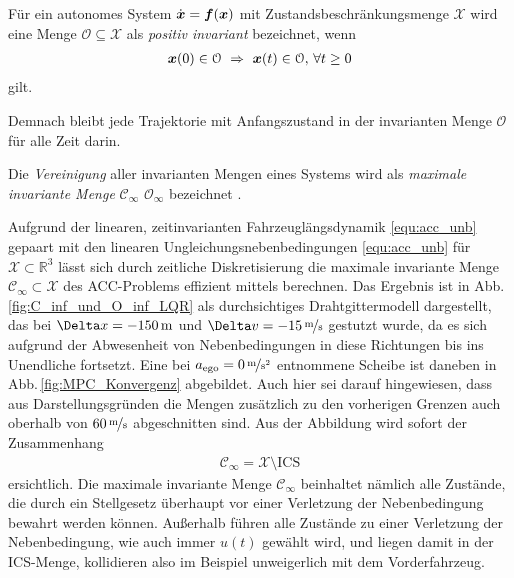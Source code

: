 \begin{mydef}
Für ein autonomes System $\dot {\boldsymbol{x}} = \boldsymbol{f}(\boldsymbol{x})$ mit Zustandsbeschränkungsmenge $\mathcal X$ wird eine Menge  $\mathcal O \subseteq \mathcal X$ als \emph{positiv invariant} bezeichnet, wenn
\begin{align*}
	\boldsymbol{x}(0) \in \mathcal O \,\,  \Rightarrow \,\,  \boldsymbol{x}(t) \in \mathcal O, \, \forall t \geq 0 
\end{align*}
gilt. 
\end{mydef}
Demnach bleibt jede Trajektorie mit Anfangszustand in der invarianten Menge $\mathcal O$ für alle Zeit darin.

\begin{mydef}
Die \emph{Vereinigung} aller invarianten Mengen eines Systems wird als \emph{maximale invariante Menge} $\mathcal C_{\infty}$ \bzw  $\mathcal O_{\infty}$ bezeichnet \cite{borrelli2014predictive}. %
\end{mydef}

Aufgrund der linearen, zeitinvarianten Fahrzeuglängsdynamik \eqref{equ:acc_unb} gepaart mit den linearen Ungleichungsnebenbedingungen \eqref{equ:acc_unb} für $\mathcal X \subset \mathbb R^3$ lässt sich durch zeitliche Diskretisierung die maximale invariante Menge $\mathcal C_{\infty} \subset \mathcal X$ des ACC-Problems effizient mittels \cite{herceg2013multi} berechnen. Das Ergebnis ist in Abb.\,\ref{fig:C_inf_und_O_inf_LQR} als durchsichtiges Drahtgittermodell dargestellt, das bei $\Delta x = -\unit[150]{m}$ und $\Delta v = -\unitfrac[15]{m}{s}$ gestutzt wurde, da es sich aufgrund der Abwesenheit von Nebenbedingungen in diese Richtungen bis ins Unendliche fortsetzt. 
Eine bei $a_\text{ego} = 0\, \unitfrac{m}{s^2}$ entnommene Scheibe ist daneben in Abb.\,\ref{fig:MPC_Konvergenz} abgebildet. Auch hier sei darauf hingewiesen, dass aus Darstellungsgründen die Mengen zusätzlich zu den vorherigen Grenzen auch oberhalb von $\unitfrac[60]{m}{s}$ abgeschnitten sind. Aus der Abbildung
wird sofort der Zusammenhang
\begin{align}
	\mathcal C_\infty = \mathcal X \setminus \text{ICS}
\end{align}
ersichtlich. Die maximale invariante Menge $\mathcal C_\infty$ beinhaltet nämlich alle Zustände, die durch ein Stellgesetz überhaupt vor einer Verletzung der Nebenbedingung bewahrt werden können. Außerhalb führen alle Zustände %
zu einer Verletzung der Nebenbedingung, wie auch immer $u(t)$ gewählt wird, und liegen damit in der ICS-Menge, kollidieren also im Beispiel unweigerlich mit dem Vorderfahrzeug. 

